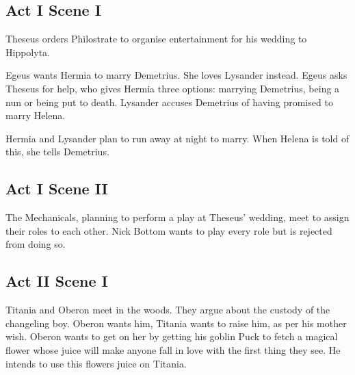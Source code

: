 \documentclass{article}
\begin{document}
\subsection{Act I Scene I}
Theseus orders Philostrate to organise entertainment for his wedding to Hippolyta. 
 
Egeus wants Hermia to marry Demetrius. She loves Lysander instead. Egeus asks Theseus for help, who gives Hermia three options: marrying Demetrius, being a nun or being put to death. Lysander accuses Demetrius of having promised to marry Helena.
 
Hermia and Lysander plan to run away at night to marry. When Helena is told of this, she tells Demetrius. 
 
\subsection{Act I Scene II}
The Mechanicals, planning to perform a play at Theseus' wedding, meet to assign their roles to each other. Nick Bottom wants to play every role but is rejected from doing so. 
 
\subsection{Act II Scene I}
Titania and Oberon meet in the woods. They argue about the custody of the changeling boy. Oberon wants him, Titania wants to raise him, as per his mother wish. Oberon wants to get  on her by getting his goblin Puck to fetch a magical flower whose juice will make anyone fall in love with the first thing they see. He intends to use this flowers juice on Titania.
 
\end{document}
